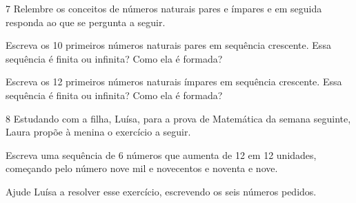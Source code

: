 \begin{mdframed}[linewidth=2pt,linecolor=salmao,roundcorner=2pt]
\begin{mdframed}[linewidth=2pt,linecolor=salmao,roundcorner=2pt]

\end{mdframed}

\num{7} Relembre os conceitos de números naturais pares e ímpares e em seguida
responda ao que se pergunta a seguir.

\begin{escolha}
\item
  Escreva os 10 primeiros números naturais pares em sequência crescente.
  Essa sequência é finita ou infinita? Como ela é formada?


\item
  Escreva os 12 primeiros números naturais ímpares em sequência
  crescente. Essa sequência é finita ou infinita? Como ela é formada?

\end{escolha}


\num{8} Estudando com a filha, Luísa, para a prova de Matemática da semana seguinte,
Laura propõe à menina o exercício a seguir.

Escreva uma sequência de 6 números que aumenta de 12 em 12 unidades,
começando pelo número nove mil e novecentos e noventa e nove.

Ajude Luísa a resolver esse exercício, escrevendo os seis números
pedidos.

\begin{mdframed}[linewidth=2pt,linecolor=salmao,roundcorner=2pt]
\vspace{1cm}
\end{mdframed}


\end{mdframed}
